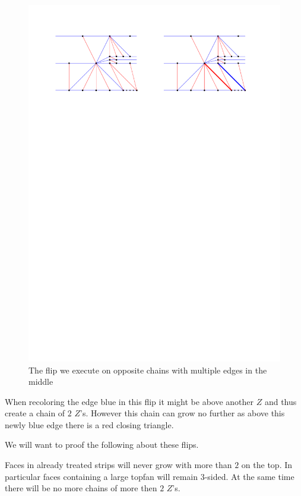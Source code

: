   \begin{figure}[h]
    \centering
    \includegraphics[width = \textwidth]{unifiedAlgo/img/post/oppMultiFlip}
    \caption{The flip we execute on opposite chains with multiple edges in the middle}
    \label{fig:uni:oppMultiFlip}
  \end{figure}

  When recoloring the edge blue in this flip it might be above another $Z$ and thus create a chain of $2$ $Z$'s. However this chain can grow no further as above this newly blue edge there is a red closing triangle.



  We will want to proof the following about these flips.

  \begin{lemma}
    \label{lm:}
    Faces in already treated strips will never grow with more than $2$ on the top. In particular faces containing a large topfan will remain 3-sided. At the same time there will be no more chains of more then $2$ $Z$'s.
  \end{lemma}

